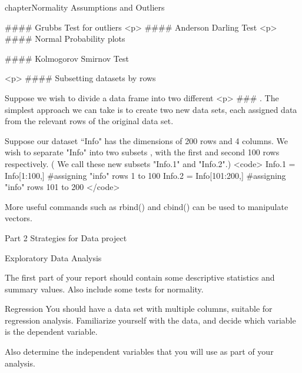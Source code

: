 

chapter{Normality Assumptions and Outliers}

#### {Grubbs Test for outliers}
<p>
#### {Anderson Darling Test}
<p>
#### {Normal Probability plots}

#### { Kolmogorov Smirnov Test}






<p>
#### {Subsetting datasets by rows}

Suppose we wish to divide a data frame into two different <p>
### . The simplest approach we can take is to create two new data sets, each assigned data from the relevant rows of the original data set.

Suppose our dataset ``Info" has the dimensions of 200 rows and 4 columns. We wish to separate "Info" into two subsets , with the first and second 100 rows respectively. ( We call these new subsets "Info.1" and "Info.2".)
<code>
Info.1 = Info[1:100,]		#assigning "info" rows 1 to 100
Info.2 = Info[101:200,]		#assigning "info" rows 101 to 200
</code>

More useful commands such as rbind() and cbind()  can be used to manipulate vectors.

Part 2 Strategies for Data project

Exploratory Data Analysis

The first part of your report should contain some descriptive statistics and summary values. Also include some tests for normality.

      {Regression}
You should have a data set with multiple columns, suitable for regression analysis.
Familiarize yourself with the data, and decide which variable is the dependent variable.

Also determine the independent variables that you will use as part of your analysis.

